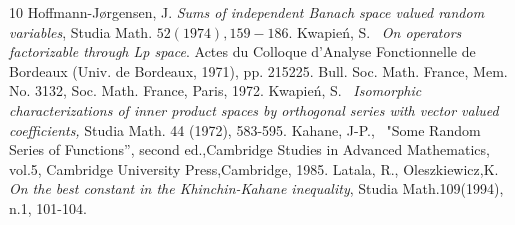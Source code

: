 \documentclass{smfart}
\theoremstyle{plain}
\theoremstyle{definition}
\begin{document}
\begin{thebibliography}{10}
 Hoffmann-J\o{}rgensen, J.  {\it Sums of independent Banach space valued random variables}, Studia Math. $52(1974), 159-186$.
Kwapie\'n, S. \ {\it On operators factorizable through Lp space}. Actes du Colloque d'Analyse Fonctionnelle de Bordeaux (Univ. de Bordeaux, 1971), pp. 215225. Bull. Soc. Math. France, Mem. No. 3132, Soc. Math. France, Paris, 1972.
 Kwapie\'n, S. \  {\it Isomorphic characterizations of inner product spaces by orthogonal series with
vector valued coefficients,} Studia Math. 44 (1972), 583-595.
 Kahane, J-P., \  "Some Random Series of Functions'', second ed.,Cambridge Studies in Advanced Mathematics, vol.5, Cambridge University Press,Cambridge, 1985.
 Latala, R., Oleszkiewicz,K.  {\it  On the best constant in the Khinchin-Kahane inequality}, Studia Math.109(1994), n.1, 101-104.

\end{thebibliography}
\end{document}
